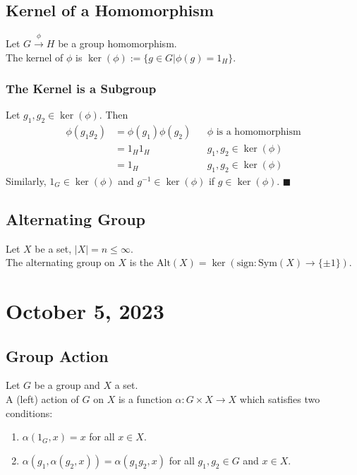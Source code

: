 \documentclass[11pt]{article}
\newcommand{\0}{\emptyset}
\begin{document}
\subsection*{Kernel of a Homomorphism}
\label{sec:org6aab6f2}
Let \(G\overset{\phi}{\to}H\) be a group homomorphism.\\[0pt]
The kernel of \(\phi\) is \(\ker(\phi):=\{g\in G|\phi(g)=1_{H}\}\).\\[0pt]
\subsubsection*{The Kernel is a Subgroup}
\label{sec:org09d8f4f}
Let \(g_{1},g_{2}\in\ker(\phi)\). Then\\[0pt]
\begin{align*}
  \phi(g_{1}g_{2})
  &=\phi(g_{1})\phi(g_{2}) && \phi\text{ is a homomorphism}
  \\&=1_{H}1_{H} && g_{1},g_{2}\in\ker(\phi)
  \\&=1_{H} && g_{1},g_{2}\in\ker(\phi)
\end{align*}
Similarly, \(1_{G}\in\ker(\phi)\) and \(g^{-1}\in\ker(\phi)\) if \(g\in\ker(\phi)\). \(\blacksquare\) \\[0pt]
\subsection*{Alternating Group}
\label{sec:orga53753c}
Let \(X\) be a set, \(|X|=n\leq\infty\).\\[0pt]
The alternating group on \(X\) is the \(\text{Alt}(X)=\ker(\text{sign}:\text{Sym}(X)\to\{\pm1\})\).\\[0pt]
\section*{October 5, 2023}
\label{sec:org898764d}
\subsection*{Group Action}
\label{sec:org659b06b}
Let \(G\) be a group and \(X\) a set.\\[0pt]
A (left) action of \(G\) on \(X\) is a function \(\alpha:G\times X\to X\) which satisfies two conditions:\\[0pt]
\begin{enumerate}
\item \(\alpha(1_{G},x)=x\) for all \(x\in X\).\\[0pt]
\item \(\alpha(g_{1},\alpha(g_{2},x))=\alpha(g_{1}g_{2},x)\) for all \(g_{1},g_{2}\in G\) and \(x\in X\).\\[0pt]
\end{enumerate}
\end{document}
